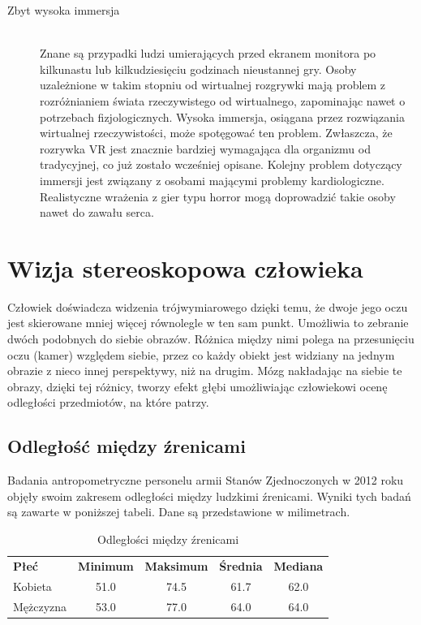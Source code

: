 \documentclass[a4paper,11pt,twoside]{report}
\theoremstyle{definition}
\begin{document}
\begin{description}
\item [Zbyt wysoka immersja] \hfill \\
Znane są przypadki ludzi umierających przed ekranem monitora po kilkunastu lub kilkudziesięciu godzinach nieustannej gry. Osoby uzależnione w takim stopniu od wirtualnej rozgrywki mają problem z rozróżnianiem świata rzeczywistego od wirtualnego, zapominając nawet o potrzebach fizjologicznych. Wysoka immersja, osiągana przez rozwiązania wirtualnej rzeczywistości, może spotęgować ten problem. Zwłaszcza, że rozrywka VR jest znacznie bardziej wymagająca dla organizmu od tradycyjnej, co już zostało wcześniej opisane. 
Kolejny problem dotyczący immersji jest związany z osobami mającymi problemy kardiologiczne. Realistyczne wrażenia z gier typu horror mogą doprowadzić takie osoby nawet do zawału serca.
\end{description}

\section{Wizja stereoskopowa człowieka}

Człowiek doświadcza widzenia trójwymiarowego dzięki temu, że dwoje jego oczu jest skierowane mniej więcej równolegle w ten sam punkt. Umożliwia to zebranie dwóch podobnych do siebie obrazów. Różnica między nimi polega na przesunięciu oczu (kamer) względem siebie, przez co każdy obiekt jest widziany na jednym obrazie z nieco innej perspektywy, niż na drugim. Mózg nakładając na siebie te obrazy, dzięki tej różnicy, tworzy efekt głębi umożliwiając człowiekowi ocenę odległości przedmiotów, na które patrzy.

\subsection{Odległość między źrenicami}

Badania antropometryczne personelu armii Stanów Zjednoczonych w 2012 roku\cite{IPdistance} objęły swoim zakresem odległości między ludzkimi źrenicami. Wyniki tych badań są zawarte w poniższej tabeli. Dane są przedstawione w milimetrach.

\begin{table}[h!]
\centering
\label{my-label}
\begin{tabular}{lcccc}
\textbf{Płeć} & \multicolumn{1}{l}{\textbf{Minimum}} & \multicolumn{1}{l}{\textbf{Maksimum}} & \multicolumn{1}{l}{\textbf{Średnia}} & \multicolumn{1}{l}{\textbf{Mediana}} \\
Kobieta       & 51.0                                 & 74.5                                  & 61.7                                 & 62.0                                 \\
Mężczyzna     & 53.0                                 & 77.0                                  & 64.0                                 & 64.0                                
\end{tabular}
\caption{Odległości między źrenicami}
\end{table}
\end{document}
